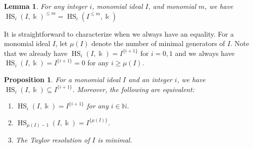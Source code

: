 \documentclass[reqno]{amsart}
\DeclareMathOperator{\HS}{HS}
\newtheorem{lemma}[theorem]{Lemma}
\newtheorem{proposition}[theorem]{Proposition}
\theoremstyle{definition}
\theoremstyle{remark}
\numberwithin{equation}{section}
\begin{document}
\begin{lemma}\label{lem:restriction-lemma}
    For any integer $i$, monomial ideal $I$, and monomial $m$, we have
    $\HS_i(I,\Bbbk)^{\leq m}=\HS_i(I^{\leq m},\Bbbk)$
\end{lemma}



It is straightforward to characterize when we always have an equality. For a monomial ideal $I$, let $\mu(I)$ denote the number of minimal generators of $I$. Note that we already have $\HS_i(I,\Bbbk)=I^{\{i+1\}}$ for $i=0,1$ and we always have $\HS_i(I,\Bbbk)=I^{\{i+1\}}=0$ for any $i\geq \mu(I)$.

\begin{proposition}\label{prop:Taylor-equality-lcm-power}
    For a monomial ideal $I$ and an integer $i$, we have $\HS_i(I,\Bbbk)\subseteq I^{\{i+1\}}$. Moreover, the following are equivalent:
    \begin{enumerate}
        \item $\HS_i(I,\Bbbk)= I^{\{i+1\}}$ for any $i\in \mathbb{N}$.
        \item $\HS_{\mu(I)-1}(I,\Bbbk)= I^{\{\mu(I)\}}$.
        \item The Taylor resolution of $I$ is minimal.
    \end{enumerate}
\end{proposition}
\end{document}
